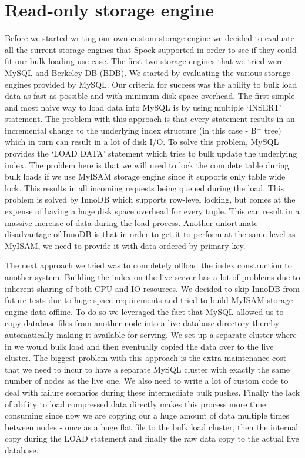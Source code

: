 \documentclass[twocolumn]{article}
\newcommand{\projectname}{Spock}
\begin{document}

\section{Read-only storage engine}
\label{sec:read_only}

Before we started writing our own custom storage engine we decided to evaluate all the current storage engines that \projectname{} supported in order to see if they could fit our bulk loading use-case. The first two storage engines that we tried were MySQL and Berkeley DB (BDB). We started by evaluating the various storage engines provided by MySQL. Our criteria for success was the ability to bulk load data as fast as possible and with minimum disk space overhead. The first simple and most naive way to load data into MySQL is by using multiple `INSERT' statement. The problem with this approach is that every statement results in an incremental change to the underlying index structure (in this case - B$^{+}$ tree) which in turn can result in a lot of disk I/O. To solve this problem, MySQL provides the `LOAD DATA' statement which tries to bulk update the underlying index. The problem here is that we will need to lock the complete table during bulk loads if we use MyISAM storage engine since it supports only table wide lock. This results in all incoming requests being queued during the load. This problem is solved by InnoDB which supports row-level locking, but comes at the expense of having a huge disk space overhead for every tuple. This can result in a massive increase of data during the load process. Another unfortunate disadvantage of InnoDB is that in order to get it to perform at the same level as MyISAM, we need to provide it with data ordered by primary key. 

The next approach we tried was to completely offload the index construction to another system. Building the index on the live server has a lot of problems due to inherent sharing of both CPU and IO resources. We decided to skip InnoDB from future tests due to huge space requirements and tried to build MyISAM storage engine data offline. To do so we leveraged the fact that MySQL allowed us to copy database files from another node into a live database directory thereby automatically making it available for serving. We set up a separate cluster where-in we would bulk load and then eventually copied the data over to the live cluster. The biggest problem with this approach is the extra maintenance cost that we need to incur to have a separate MySQL cluster with exactly the same number of nodes as the live one. We also need to write a lot of custom code to deal with failure scenarios during these intermediate bulk pushes. Finally the lack of ability to load compressed data directly makes this process more time consuming since now we are copying our a huge amount of data multiple times between nodes - once as a huge flat file to the bulk load cluster, then the internal copy during the LOAD statement and finally the raw data copy to the actual live database. 
\end{document}
